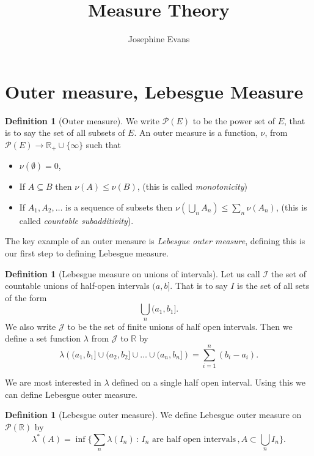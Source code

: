 \documentclass[11pt]{article}
\author{
Josephine Evans
}
\title{Measure Theory}
\theoremstyle{definition}
\newtheorem{dfn}[thm]{Definition}
\theoremstyle{remark}
\begin{document}
\section{Outer measure, Lebesgue Measure}

\begin{dfn}[Outer measure]
We write $\mathscr{P}(E)$ to be the power set of $E$, that is to say the set of all subsets of $E$. An outer measure is a function, $\nu$, from $\mathscr{P}(E) \rightarrow \mathbb{R}_+ \cup \{\infty\}$ such that
\begin{itemize}
\item $\nu(\emptyset) =0$,
\item If $A \subseteq B$ then $\nu (A) \leq \nu(B)$, (this is called \emph{monotonicity})
\item If $A_1, A_2, \dots$ is a sequence of subsets then $\nu\left( \bigcup_n A_n \right) \leq \sum_n \nu(A_n)$, (this is called \emph{countable subadditivity}).
\end{itemize}
\end{dfn}

The key example of an outer measure is \emph{Lebesgue outer measure}, defining this is our first step to defining Lebesgue measure.
\begin{dfn}[Lebesgue measure on unions of intervals]
Let us call $\mathcal{I}$ the set of countable unions of half-open intervals $(a,b]$. That is to say $I$ is the set of all sets of the form
\[ \bigcup_n (a_1,b_1]. \]  We also write $\mathcal{J}$ to be the set of finite unions of half open intervals. Then we define a set function $\lambda$ from $\mathcal{J}$ to $\mathbb{R}$ by
\[ \lambda \left(  (a_1, b_1] \cup (a_2,b_2] \cup \dots \cup (a_n,b_n] \right) = \sum_{i=1}^n (b_i-a_i).\]
\end{dfn}
We are most interested in $\lambda$ defined on a single half open interval. 
Using this we can define Lebesgue outer measure.
\begin{dfn}[Lebesgue outer measure]
We define Lebesgue outer measure on $\mathscr{P}(\mathbb{R})$ by 
\[ \lambda^* (A) = \inf \{ \sum_n\lambda (I_n) \, : \, \mbox{$I_n$ are half open intervals}\, , A \subset \bigcup_n I_n\}. \]
\end{dfn}
\end{document}
